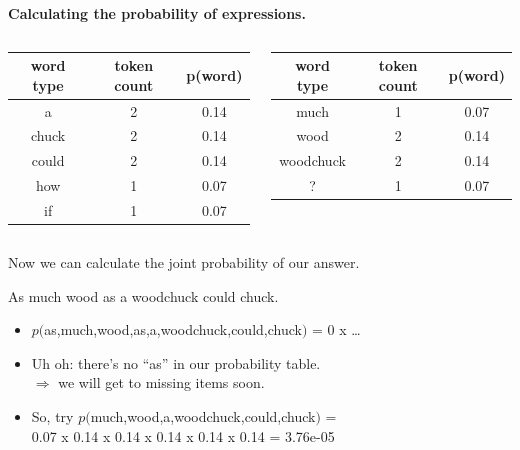 \documentclass{beamer}
\newcommand{\pagestepalt}[2]{
  \begin{frame}[t]
    \begin{minipage}[t][0.26\textheight][t]{\textwidth}
      \begin{center}
        \huge
        \textbf{#1}
      \end{center}
    \end{minipage}
    
    \begin{minipage}[t][0.7\textheight][t]{\textwidth}
      #2
    \end{minipage}
  \end{frame}
}
\begin{document}
\pagestepalt{Calculating the probability of expressions.}{
  \vspace{-1cm}
  \begin{columns}[T]
    \begin{column}{0.5\textwidth}
      \begin{center}
        \small
        \begin{tabular}{c|c|c}
          word type & token count & \alert{p(word)}\\
          \hline
          a & 2 & 0.14\\
          chuck & 2 & 0.14 \\
          could & 2 & 0.14 \\
          how & 1 & 0.07\\
          if & 1 & 0.07 \\
        \end{tabular}
      \end{center}
    \end{column}
    \begin{column}{0.5\textwidth}
      \begin{center}
        \small
        \begin{tabular}{c|c|c}
          word type & token count & \alert{p(word)} \\
          \hline
          much & 1 & 0.07\\
          wood & 2 & 0.14 \\
          woodchuck  &2 & 0.14 \\
          ? & 1 & 0.07 \\
        \end{tabular}
      \end{center}
    \end{column}
  \end{columns}
  Now we can calculate the joint probability of our answer.
  \begin{center}
    \Large As much wood as a woodchuck could chuck. 
  \end{center}
  \begin{itemize}
  \item $p($as,much,wood,as,a,woodchuck,could,chuck$)$ = \pause \alert{0 x \ldots}\pause
  \item Uh oh: there's no ``as'' in our probability table. \\
    $\Rightarrow$ we will get to missing items soon.\pause
  \item So, try $p($much,wood,a,woodchuck,could,chuck$)$ = \\ \pause \alert{0.07 x 0.14 x 0.14 x 0.14 x 0.14 x 0.14  = 3.76e-05}
  \end{itemize}
}
\end{document}

